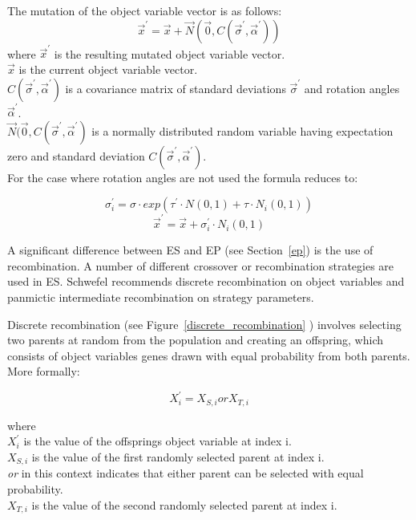 The mutation of the object variable vector is as follows:
\begin{displaymath}
\vec{x}^{'} = \vec{x} + \vec{N}(\vec{0},C(\vec{\sigma}^{'},\vec{\alpha}^{'}))
\end{displaymath}
where
$\vec{x}^{'}$ is the resulting mutated object variable vector. \\
$\vec{x}$ is the current object variable vector. \\
$C(\vec{\sigma}^{'},\vec{\alpha}^{'})$ is a covariance matrix of standard deviations $\vec{\sigma}^{'}$ and rotation angles $\vec{\alpha}^{'}$. \\
$\vec{N}(\vec{0},C(\vec{\sigma}^{'},\vec{\alpha}^{'})$ is a normally distributed random variable having expectation zero and standard deviation $C(\vec{\sigma}^{'},\vec{\alpha}^{'})$. \\

For the case where rotation angles are not used the formula reduces to:

\begin{displaymath}
\sigma_i^{'} = \sigma\cdot exp(\tau^{'}\cdot N(0,1) + \tau\cdot N_i(0,1))
\end{displaymath}
\begin{displaymath}
\vec{x}^{'} = \vec{x} + \sigma_i^{'} \cdot N_i(0,1)
\end{displaymath}


\label{es_recombination}A significant difference between ES and EP (see Section~\ref{ep}) is the use of recombination. A number of different crossover or recombination strategies are used in ES. Schwefel recommends discrete recombination on object variables and panmictic intermediate recombination on strategy parameters. 

Discrete recombination (see Figure~\ref{discrete_recombination} ) involves selecting two parents at random from the population and creating an offspring, which consists of object variables genes drawn with equal probability from both parents. More formally: 

\begin{displaymath}
X^{'}_i = X_{S,i} or X_{T,i} 
\end{displaymath}

where \\
$X^{'}_i$ is the value of the offsprings object variable at index i. \\
$X_{S,i}$ is the value of the first randomly selected parent at index i. \\
\emph{or} in this context indicates that either parent can be selected with equal probability. \\
$X_{T,i}$ is the value of the second randomly selected parent at index i. \\


